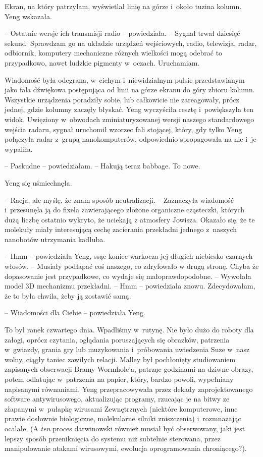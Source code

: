 \documentclass[oneside,polish,11pt,sfheadings]{mwbk}
\begin{document}
Ekran, na który patrzyłam, wyświetlał linię na górze i~około tuzina
kolumn. Yeng wskazała. 

-- Ostatnie wersje ich transmisji radio -- powiedziała. -- Sygnał trwał dziesięć sekund. Sprawdzam go na układzie
urządzeń wejściowych, radio, telewizja, radar, odbiornik, komputery
mechaniczne różnych wielkości mogą odebrać to przypadkowo, nawet ludzkie
pigmenty w~oczach. Uruchamiam.

Wiadomość była odegrana, w~cichym i~niewidzialnym pulsie przedstawianym
jako fala dźwiękowa postępująca od linii na górze ekranu do góry zbioru
kolumn. Wszystkie urządzenia poradziły sobie, lub całkowicie nie
zareagowały, prócz jednej, gdzie kolumny zaczęły błyskać. Yeng
wyczyściła resztę i~powiększyła ten widok. Uwięziony w~obwodach
zminiaturyzowanej wersji naszego standardowego wejścia radaru, sygnał
uruchomił wzorzec fali stojącej, który, gdy tylko Yeng połączyła radar z~grupą nanokomputerów, odpowiednio spropagowała na nie i~je wypaliła.

-- Paskudne -- powiedziałam. -- Hakują teraz babbage. To nowe.

Yeng się uśmiechnęła. 

-- Racja, ale myślę, że znam sposób neutralizacji.
-- Zaznaczyła wiadomość i~przesunęła ją do fixela zawierającego złożone
organiczne cząsteczki, których dużą liczbę ostatnio wykryto, że uciekają
z atmosfery Jowisza. Okazało się, że te molekuły miały interesującą
cechę zacierania przekładni jednego z~naszych nanobotów utrzymania
kadłuba.

-- Hmm -- powiedziała Yeng, ssąc koniec warkocza jej długich
niebiesko-czarnych włosów. -- Musiały podłapać coś naszego, co zdryfowało
w drugą stronę. Chyba że dopasowanie jest przypadkowe, co wydaje się
małoprawdopodobne. -- Wywołała model 3D mechanizmu przekładni. -- Hmm -- powiedziała znowu. Zdecydowałam, że to była chwila, żeby ją zostawić
samą.

-- Wiadomości dla Ciebie -- powiedziała Yeng.

To był ranek czwartego dnia. Wpadliśmy w~rutynę. Nie było dużo do roboty
dla załogi, oprócz czytania, oglądania poruszających się obrazków,
patrzenia w~gwiazdy, grania gry lub muzykowania i~próbowania uwiedzenia
Suze w~nasz wolny, ciągły taniec zawiłych relacji. Malley był
pochłonięty studiowaniem zapisanych obserwacji Bramy Wormhole'a, patrząc
godzinami na dziwne obrazy, potem odlatując w~patrzenia na papier,
który, bardzo powoli, wypełniany napisanymi równaniami. Yeng
przepracowywała przez dekady zaprojektowanego software antywirusowego,
aktualizując programy, rzucając je na bitwy ze złapanymi w~pułapkę
wirusami Zewnętrznych (niektóre komputerowe, inne prawie dosłownie
biologiczne, molekularne silniki zniszczenia) i~rozmnażając ocalałe. (A
\textit{ten} proces darwinowski również musiał być obserwowany, jaki jest
lepszy sposób przeniknięcia do systemu niż subtelnie sterowana, przez
manipulowanie atakami wirusowymi, ewolucja oprogramowania chroniącego?).
\end{document}
